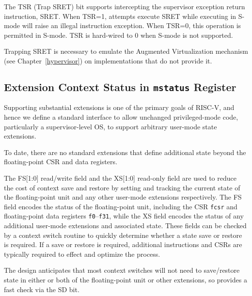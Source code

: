 The TSR (Trap SRET) bit supports intercepting the supervisor exception return
instruction, SRET.  When TSR=1, attempts execute SRET while executing in
S-mode will raise an illegal instruction exception.  When TSR=0, this
operation is permitted in S-mode.  TSR is hard-wired to 0 when S-mode is not
supported.

\begin{commentary}
Trapping SRET is necessary to emulate the Augmented Virtualization mechanism
(see Chapter~\ref{hypervisor}) on implementations that do not provide it.
\end{commentary}

\subsection{Extension Context Status in {\tt mstatus} Register}

Supporting substantial extensions is one of the primary goals of
RISC-V, and hence we define a standard interface to allow unchanged
privileged-mode code, particularly a supervisor-level OS, to support
arbitrary user-mode state extensions.

\begin{commentary}
  To date, there are no standard extensions that define additional
  state beyond the floating-point CSR and data registers.
\end{commentary}

The FS[1:0] read/write field and the XS[1:0] read-only field are used
to reduce the cost of context save and restore by setting and tracking
the current state of the floating-point unit and any other user-mode
extensions respectively.  The FS field encodes the status of the
floating-point unit, including the CSR {\tt fcsr} and floating-point
data registers {\tt f0}--{\tt f31}, while the XS field encodes the
status of any additional user-mode extensions and associated state.
These fields can be checked by a context switch routine to quickly
determine whether a state save or restore is required.  If a save or
restore is required, additional instructions and CSRs are typically
required to effect and optimize the process.

\begin{commentary}
  The design anticipates that most context switches will not need to
  save/restore state in either or both of the floating-point unit or
  other extensions, so provides a fast check via the SD bit.
\end{commentary}

